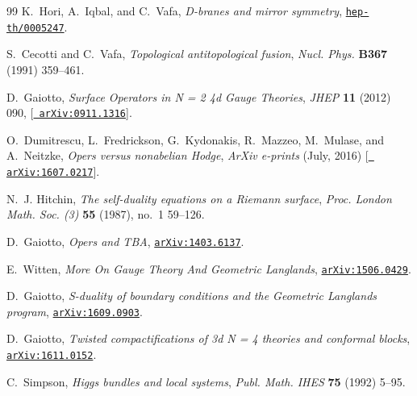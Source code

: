 \begin{thebibliography}{99}
K.~Hori, A.~Iqbal, and C.~Vafa, {\it {D-branes and mirror symmetry}},
  \href{http://xxx.lanl.gov/abs/hep-th/0005247}{{\tt hep-th/0005247}}.

S.~Cecotti and C.~Vafa, {\it {Topological antitopological fusion}},  {\em Nucl.
  Phys.} {\bf B367} (1991) 359--461.

D.~Gaiotto, {\it {Surface Operators in N = 2 4d Gauge Theories}},  {\em JHEP}
  {\bf 11} (2012) 090, [\href{http://xxx.lanl.gov/abs/0911.1316}{{\tt
  arXiv:0911.1316}}].

O.~{Dumitrescu}, L.~{Fredrickson}, G.~{Kydonakis}, R.~{Mazzeo}, M.~{Mulase},
  and A.~{Neitzke}, {\it {Opers versus nonabelian Hodge}},  {\em ArXiv
  e-prints} (July, 2016) [\href{http://xxx.lanl.gov/abs/1607.0217}{{\tt
  arXiv:1607.0217}}].

N.~J. Hitchin, {\it The self-duality equations on a {R}iemann surface},  {\em
  Proc. London Math. Soc. (3)} {\bf 55} (1987), no.~1 59--126.

D.~Gaiotto, {\it {Opers and TBA}},
  \href{http://xxx.lanl.gov/abs/1403.6137}{{\tt arXiv:1403.6137}}.

E.~Witten, {\it {More On Gauge Theory And Geometric Langlands}},
  \href{http://xxx.lanl.gov/abs/1506.0429}{{\tt arXiv:1506.0429}}.

D.~Gaiotto, {\it {S-duality of boundary conditions and the Geometric Langlands
  program}},  \href{http://xxx.lanl.gov/abs/1609.0903}{{\tt arXiv:1609.0903}}.

D.~Gaiotto, {\it {Twisted compactifications of 3d N = 4 theories and conformal
  blocks}},  \href{http://xxx.lanl.gov/abs/1611.0152}{{\tt arXiv:1611.0152}}.

C.~Simpson, {\it Higgs bundles and local systems},  {\em Publ. Math. IHES} {\bf
  75} (1992) 5--95.

\end{thebibliography}
